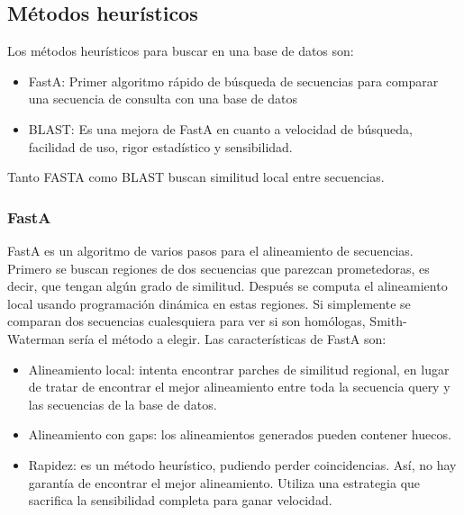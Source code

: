 \subsection{Métodos heurísticos}
Los métodos heurísticos para buscar en una base de datos son:
\begin{itemize}
\item FastA: Primer algoritmo rápido de búsqueda de secuencias para comparar una secuencia de consulta con una base de datos
\item BLAST: Es una mejora de FastA en cuanto a velocidad de búsqueda, facilidad de uso, rigor estadístico y sensibilidad.
\end{itemize}

Tanto FASTA como BLAST buscan similitud local entre secuencias.

\subsubsection{FastA}
FastA es un algoritmo de varios pasos para el alineamiento de secuencias. Primero se buscan regiones de dos secuencias que parezcan prometedoras, es decir, que tengan algún grado de similitud. Después se computa el alineamiento local usando programación dinámica en estas regiones. Si simplemente se comparan dos secuencias cualesquiera para ver si son homólogas, Smith-Waterman sería el método a elegir. Las características de FastA son:
\begin{itemize}
\item Alineamiento local: intenta encontrar parches de similitud regional, en lugar de tratar de encontrar el mejor alineamiento entre toda la secuencia query y las secuencias de la base de datos. 
\item Alineamiento con gaps: los alineamientos generados pueden contener huecos.
\item Rapidez: es un método heurístico, pudiendo perder coincidencias. Así, no hay garantía de encontrar el mejor alineamiento. Utiliza una estrategia que sacrifica la sensibilidad completa para ganar velocidad.
\end{itemize}

